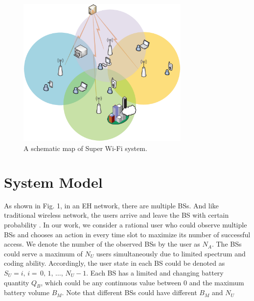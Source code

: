 \documentclass[conference]{IEEEtran}
\begin{document}
\begin{figure}\label{fig1}
\centering
\includegraphics[width=8.5cm]{Fig1.eps}
\caption{A schematic map of Super Wi-Fi system.}
\end{figure}
\section{System Model}
As shown in Fig. 1, in an EH network, there are multiple BSs. 
And like traditional wireless network, the users arrive and leave the BS with certain probability \cite{5}.
In our work, we consider a rational user who could observe multiple BSs and
chooses an action in every time slot to maximize its number of successful access.
We denote the number of the observed BSs by the user as \(N_A\).
The BSs could serve a maximum of \(N_U\) users simultaneously due to limited spectrum and coding ability.
Accordingly, the user state in each BS could be denoted as \(S_U = i,\, i = \,0,\,1,\,\ldots,\,N_U-1\).
Each BS has a limited and changing battery quantity \(Q_B\), 
which could be any continuous value between \(0\) and the maximum battery volume \(B_M\).
Note that different BSs could have different \(B_M\) and \(N_U\)
\end{document}
